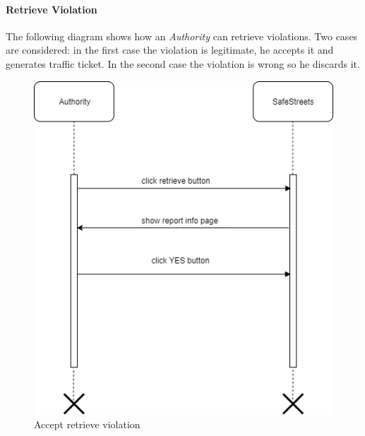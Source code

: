 \documentclass{article}
\begin{document}
\paragraph{Retrieve Violation}
The following diagram shows how an \textit{Authority} can retrieve violations. Two cases are considered: in the 
first case the violation is legitimate, he accepts it and generates traffic ticket. In the second case the violation
is wrong so he discards it. 
\begin{figure}[H]
    \centering
    \includegraphics[scale=0.5]{img/sequence_diagrams/accept_retrieve_violation.png}
    \caption{Accept retrieve violation}
\end{figure}
\end{document}
